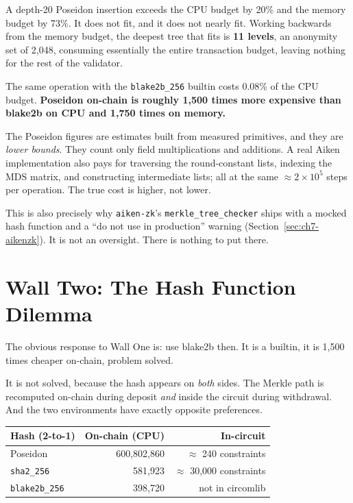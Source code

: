 A depth-20 Poseidon insertion exceeds the CPU budget by 20\% and the memory
budget by 73\%. It does not fit, and it does not nearly fit. Working backwards
from the memory budget, the deepest tree that fits is \textbf{11 levels}, an
anonymity set of 2{,}048, consuming essentially the entire transaction
budget, leaving nothing for the rest of the validator.

The same operation with the \texttt{blake2b\_256} builtin costs 0.08\% of the
CPU budget. \textbf{Poseidon on-chain is roughly 1{,}500 times more expensive
than blake2b on CPU and 1{,}750 times on memory.}

\begin{remark}
The Poseidon figures are estimates built from measured primitives, and they are
\emph{lower bounds}. They count only field multiplications and additions. A real
Aiken implementation also pays for traversing the round-constant lists, indexing
the MDS matrix, and constructing intermediate lists; all at the same
$\approx 2\times10^5$ steps per operation. The true cost is higher, not lower.

This is also precisely why \texttt{aiken-zk}'s \texttt{merkle\_tree\_checker}
ships with a mocked hash function and a ``do not use in production'' warning
(Section~\ref{sec:ch7-aikenzk}). It is not an oversight. There is nothing to
put there.
\end{remark}

\section{Wall Two: The Hash Function Dilemma} \label{sec:ch8-wall2}

The obvious response to Wall One is: use blake2b then. It is a builtin, it is
1{,}500 times cheaper on-chain, problem solved.

It is not solved, because the hash appears on \emph{both} sides. The Merkle path
is recomputed on-chain during deposit \emph{and} inside the circuit during
withdrawal. And the two environments have exactly opposite preferences.

\begin{center}
\begin{tabular}{lrr}
  \hline
  \textbf{Hash (2-to-1)} & \textbf{On-chain (CPU)} & \textbf{In-circuit} \\
  \hline
  Poseidon      & 600{,}802{,}860 & $\approx$ 240 constraints \\
  \texttt{sha2\_256}     & 581{,}923       & $\approx$ 30{,}000 constraints \\
  \texttt{blake2b\_256}  & 398{,}720       & not in circomlib \\
  \hline
\end{tabular}
\end{center}

